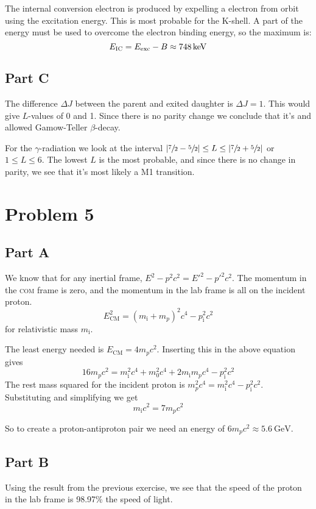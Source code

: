 \documentclass[a4paper, parskip=half, twopage]{scrartcl}
\begin{document}
The internal conversion electron is produced by expelling a electron from orbit using the excitation energy. This is most probable for the K-shell. A part of the energy must be used to overcome the electron binding energy, so the maximum is:
\[
E_{\text{\textsc{IC}}} = E_{\text{exc}} - B \approx \SI{748}{\keV}
\]

\subsection*{Part C}

The difference $\Delta J$ between the parent and exited daughter is $\Delta J = 1$. This would give $L$-values of 0 and 1. Since there is no parity change we conclude that it's and allowed Gamow-Teller $\beta$-decay.

For the $\gamma$-radiation we look at the interval $|\sfrac 7 2 - \sfrac 5 2 | \leq L \leq | \sfrac 7 2 + \sfrac 5 2 |$ or $1 \leq L \leq 6$. The lowest $L$ is the most probable, and since there is no change in parity, we see that it's most likely a M1 transition.

\section*{Problem 5}

\subsection*{Part A}
We know that for any inertial frame, $E^2 - p^2 c^2 = E'^2 - p'^2 c^2$. The momentum in the \textsc{com} frame is zero, and the momentum in the lab frame is all on the incident proton.
\[
E_{\mathrm{CM}}^2 = (m_\mathrm{i} + m_p)^2 c^4 - p_\mathrm{i}^2 c^2
\]
for relativistic mass $m_\mathrm{i}$.

The least energy needed is $E_\mathrm{CM} = 4 m_p c^2$. Inserting this in the above equation gives
\[
16 m_p c^2 = m_\mathrm{i}^2 c^4 + m_0^2 c^4 + 2 m_\mathrm{i} m_p c^4 - p_\mathrm{i}^2 c^2
\]
The rest mass squared for the incident proton is $m_p^2 c^4 = m_\mathrm{i}^2 c^4 - p_\mathrm{i}^2 c^2$. Substituting and simplifying we get
\[
m_\mathrm{i} c^2 = 7 m_p c^2
\]

So to create a proton-antiproton pair we need an energy of $6m_p c^2 \approx \SI{5.6}{\GeV}$.

\subsection*{Part B}
Using the result from the previous exercise, we see that the speed of the proton in the lab frame is 98.97\% the speed of light.
\end{document}
